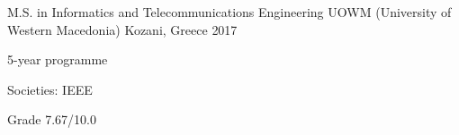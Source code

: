 


\begin{cventries}


\cventry
{M.S. in Informatics and Telecommunications Engineering} %
{UOWM (University of Western Macedonia)} %
{Kozani, Greece} %
{2017} %
{ %
\begin{cvitems}
\item {5-year programme}
\item{Societies: IEEE}
\item {Grade 7.67/10.0}
\end{cvitems}
}


\end{cventries}
